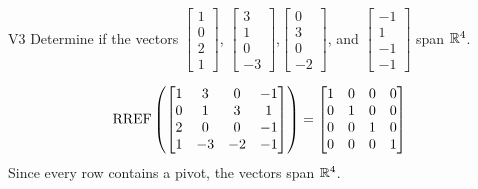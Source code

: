 \documentclass{sbgLAexam}
\begin{document}
\begin{extract}\newpage\end{extract}
\begin{problem}{V3}
Determine if the vectors $\begin{bmatrix} 1 \\ 0 \\ 2 \\1 \end{bmatrix}$, $\begin{bmatrix} 3 \\ 1 \\ 0 \\ -3 \end{bmatrix}$,$\begin{bmatrix} 0 \\ 3 \\ 0 \\ -2 \end{bmatrix}$, and $\begin{bmatrix}-1 \\ 1 \\ -1 \\ -1 \end{bmatrix}$ span $\mathbb{R}^4$.
\end{problem}
\begin{solution}
$$\operatorname{RREF}\left(\begin{bmatrix}1 & 3 & 0 & -1 \\ 0 & 1 & 3 & 1 \\ 2 & 0 & 0 & -1 \\ 1 & -3 & -2 & -1 \end{bmatrix} \right) =\begin{bmatrix} 1 & 0 & 0 & 0 \\ 0 & 1 & 0 & 0 \\ 0 & 0 & 1 & 0 \\ 0 & 0 & 0 & 1 \end{bmatrix}$$
Since every row contains a pivot, the vectors span $\mathbb{R}^4$.
\end{solution}
\end{document}
